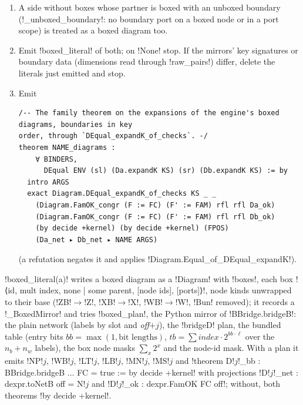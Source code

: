 {\begin{algorithm}\label{alg:lean-export-net-family-diagrams}
\begin{enumerate}
\item A side without boxes whose partner is boxed with an unboxed boundary
  (\py!_unboxed_boundary!: no boundary port on a boxed node or in a port scope) is treated as a
  boxed diagram too.
\item Emit \py!boxed_literal! of both; on \py!None! stop. If the mirrors' key signatures or
  boundary data (dimensions read through \py!raw_pairs!) differ, delete the literals just emitted
  and stop.
\item Emit
\begin{lstlisting}[style=leannet]
/-- The family theorem on the expansions of the engine's boxed diagrams, boundaries in key
order, through `DEqual_expandK_of_checks`. -/
theorem NAME_diagrams :
    ∀ BINDERS,
      DEqual ENV (sl) (Da.expandK KS) (sr) (Db.expandK KS) := by
  intro ARGS
  exact Diagram.DEqual_expandK_of_checks KS _ _
    (Diagram.FamOK_congr (F := FC) (F' := FAM) rfl rfl Da_ok)
    (Diagram.FamOK_congr (F := FC) (F' := FAM) rfl rfl Db_ok)
    (by decide +kernel) (by decide +kernel) (FPOS)
    (Da_net ▸ Db_net ▸ NAME ARGS)
\end{lstlisting}
  (a refutation negates it and applies \lean!Diagram.Equal_of_DEqual_expandK!).
\end{enumerate}
\end{algorithm}

\py!boxed_literal(a)! writes a boxed diagram as a \lean!Diagram! with \lean!boxes!, each box
\code!⟨id, mult index, none | some parent, [node ids], [ports]⟩!, node kinds unwrapped to their
base (\code!ZB!$\to$\code!Z!, \code!XB!$\to$\code!X!, \code!WB!$\to$\code!W!, \code!Bun! removed);
it records a \py!_BoxedMirror! and tries \py!boxed_plan!, the Python mirror of
\lean!BBridge.bridgeB!: the plain network (labels by slot and \textit{off}$+j$), the
\lean!bridgeD! plan, the bundled table (entry bits $bb = \max(1,\text{bit lengths})$,
$tb = \sum \textit{index}\cdot2^{bb\cdot\ell}$ over the $n_b+n_w$ labels), the box node masks
$\sum_x 2^{x}$ and the node-id mask. With a plan it emits \code!NP!$j$, \code!WB!$j$,
\code!LT!$j$, \code!LB!$j$, \code!MN!$j$, \code!MS!$j$ and
\code!theorem D!$j$\code!_bb : BBridge.bridgeB ... FC = true := by decide +kernel! with projections
\code!D!$j$\code!_net : dexpr.toNetB off = N!$j$ and \code!D!$j$\code!_ok : dexpr.FamOK FC off!;
without, both theorems \code!by decide +kernel!.

}
